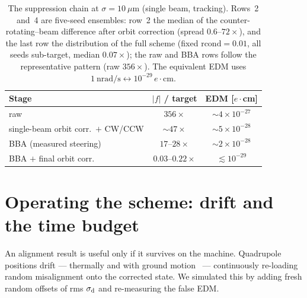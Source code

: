 \documentclass[aps,prab,reprint,superscriptaddress,nofootinbib]{revtex4-2}
\begin{document}
\begin{table}[tb]
\caption{The suppression chain at $\sigma = 10~\mu$m (single beam, tracking).
Rows~2 and~4 are five-seed ensembles: row~2 the median of the
counter-rotating--beam difference after orbit correction (spread
$0.6$--$72\times$), and the last row the distribution
of the full scheme (fixed $\mathrm{rcond}=0.01$, all seeds sub-target, median
$0.07\times$); the raw and BBA rows follow the representative pattern (raw
$356\times$).  The equivalent EDM uses
$1~\text{nrad/s} \leftrightarrow 10^{-29}\,e\!\cdot\!$cm.}
\label{tab:chain}
\small
\begin{ruledtabular}
\begin{tabular}{lcc}
Stage & $|f|$ / target & EDM [$e\!\cdot\!$cm] \\
\hline
raw                            & $356\times$ & $\sim4\times10^{-27}$ \\
single-beam orbit corr.\ $+$ CW/CCW & $\sim47\times$ & $\sim5\times10^{-28}$ \\
BBA (measured steering)        & $17$--$28\times$ & $\sim2\times10^{-28}$ \\
BBA $+$ final orbit corr.      & $0.03$--$0.22\times$ & $\lesssim10^{-29}$ \\
\end{tabular}
\end{ruledtabular}
\end{table}


\section{Operating the scheme: drift and the time budget}
\label{sec:operation}

An alignment result is useful only if it survives on the machine.  Quadrupole
positions drift --- thermally and with ground motion~\cite{rossbach} ---
continuously
re-loading random misalignment onto the corrected state.  We simulated this by
adding fresh random offsets of rms $\sigma_{\rm d}$ and re-measuring the false
EDM.
\end{document}
